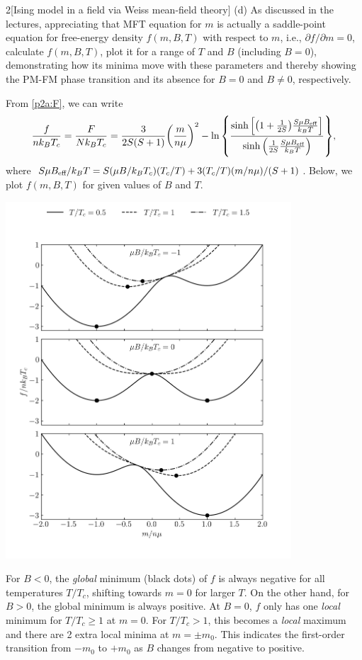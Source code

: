 \documentclass[12pt]{article}
\begin{document}
\begin{problem}{2}[Ising model in a field via Weiss mean-field theory]
(d) As discussed in the lectures, appreciating that MFT equation for $m$ is
actually a saddle-point equation for free-energy density $f(m,B,T)$ with respect
to $m$, i.e., $\partial f/\partial m=0$, calculate $f(m,B,T)$, plot it for a
range of $T$ and $B$ (including $B=0$), demonstrating how its minima move with
these parameters and thereby showing the PM-FM phase transition and its absence
for $B=0$ and $B\neq 0$, respectively.
\begin{solution}
From \eqref{p2a:F}, we can write
\begin{equation}
    \frac{f}{nk_BT_c}=\frac{F}{Nk_BT_c}
    =\frac{3}{2S(S+1)}\qty(\frac{m}{n\mu})^2-\ln\qty{\frac{\sinh\qty[\qty(1+\frac1{2S})\frac{S\mu
    B_{\text{eff}}}{k_BT}]}{\sinh\qty(\frac1{2S}\frac{S\mu B_{\text{eff}}}{k_BT})}},
\end{equation}
where $S\mu B_{\text{eff}}/k_BT=S(\mu B/k_BT_c)(T_c/T)+3(T_c/T)(m/n\mu)/(S+1)$.
Below, we plot $f(m,B,T)$ for given values of $B$ and $T$.
\begin{center}
    \includegraphics[width=0.8\textwidth]{p2d.png} 
\end{center}
For $B<0$, the \textit{global} minimum (black dots) of $f$ is always negative 
for all temperatures $T/T_c$, shifting towards $m=0$ for larger $T$. On the 
other hand, for $B>0$, the global minimum is always positive. At $B=0$, $f$ 
only has one \textit{local} minimum for $T/T_c\geq 1$ at $m=0$. For $T/T_c>1$, 
this becomes a \textit{local} maximum and there are 2 extra local minima at 
$m=\pm m_0$. This indicates the first-order transition from $-m_0$ to $+m_0$ as 
$B$ changes from negative to positive.
\end{solution}


\end{problem}
\end{document}
